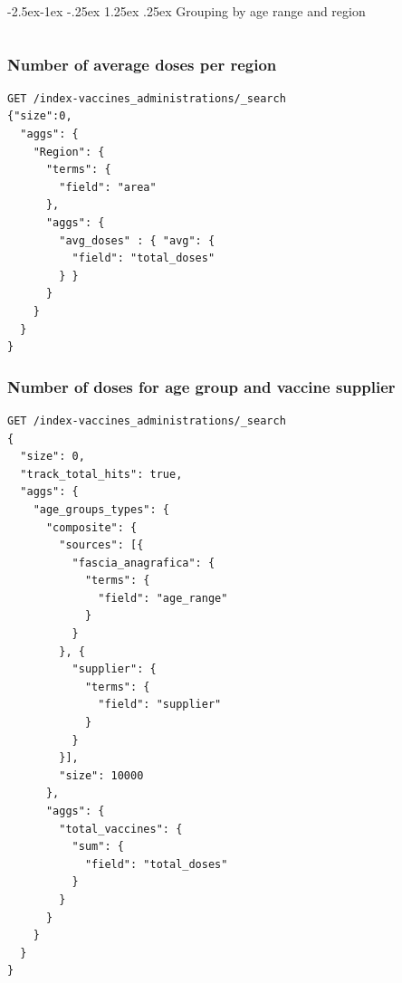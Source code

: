 \documentclass[12pt, a4paper]{article}
\makeatletter
\newcommand\subsubsubsection{\@startsection{paragraph}{4}{\z@} %
                            {-2.5ex\@plus -1ex \@minus -.25ex} %
                            {1.25ex \@plus .25ex} %
                            {\normalfont\normalsize\bfseries}}
\makeatother
\begin{document}
\noindent
\blindtext

\subsubsubsection{Grouping by age range and region}

\begin{tcolorbox}[fontupper=\scriptsize]
    \begin{verbatim}
    \end{verbatim}
\end{tcolorbox}

\noindent
\blindtext

\subsubsection{Number of average doses per region}

\begin{tcolorbox}[fontupper=\scriptsize]
    \begin{verbatim}
GET /index-vaccines_administrations/_search
{"size":0,
  "aggs": {
    "Region": {
      "terms": {
        "field": "area"
      },
      "aggs": {
        "avg_doses" : { "avg": {
          "field": "total_doses"
        } } 
      }
    }
  }
}

    \end{verbatim}
\end{tcolorbox}

\noindent
\blindtext

\subsubsection{Number of doses for age group and vaccine supplier}

\begin{tcolorbox}[fontupper=\scriptsize]
    \begin{verbatim}
GET /index-vaccines_administrations/_search
{
  "size": 0,
  "track_total_hits": true,
  "aggs": {
    "age_groups_types": {
      "composite": {
        "sources": [{
          "fascia_anagrafica": {
            "terms": { 
              "field": "age_range"
            }
          }
        }, {
          "supplier": {
            "terms": { 
              "field": "supplier"
            }
          }
        }], 
        "size": 10000
      },
      "aggs": {
        "total_vaccines": {
          "sum": {
            "field": "total_doses"
          }
        }
      }
    }
  }
}
    \end{verbatim}
\end{tcolorbox}

\noindent
\blindtext
\end{document}
